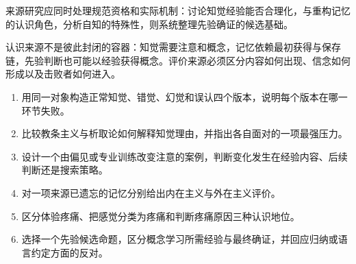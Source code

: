 来源研究应同时处理规范资格和实际机制：\textcite{siegel2017}讨论知觉经验能否合理化，\textcite{bernecker2010}与\textcite{fernandez2019}重构记忆的认识角色，\textcite{gertler2011}分析自知的特殊性，\textcite{casullo2003}则系统整理先验确证的候选基础。

\begin{checkpoint}
认识来源不是彼此封闭的容器：知觉需要注意和概念，记忆依赖最初获得与保存链，先验判断也可能以经验获得概念。评价来源必须区分内容如何出现、信念如何形成以及击败者如何进入。
\end{checkpoint}

\begin{exercises}
\begin{enumerate}
  \item 用同一对象构造正常知觉、错觉、幻觉和误认四个版本，说明每个版本在哪一环节失败。
  \item 比较教条主义与析取论如何解释知觉理由，并指出各自面对的一项最强压力。
  \item 设计一个由偏见或专业训练改变注意的案例，判断变化发生在经验内容、后续判断还是搜索策略。
  \item 对一项来源已遗忘的记忆分别给出内在主义与外在主义评价。
  \item 区分体验疼痛、把感觉分类为疼痛和判断疼痛原因三种认识地位。
  \item 选择一个先验候选命题，区分概念学习所需经验与最终确证，并回应归纳或语言约定方面的反对。
\end{enumerate}
\end{exercises}

\clearpage
\begin{readingmap}
\end{readingmap}
